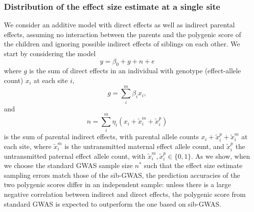 \documentclass[hidelinks, 12pt]{article}
\begin{document}
\subsubsection{Distribution of the effect size estimate at a single site}
We consider an additive model with direct effects as well as indirect parental effects, assuming no interaction between the parents and the polygenic score of the children and ignoring possible indirect effects of siblings on each other.
We start by considering the model
$$y=\beta_0+g+n+e$$
where $g$ is the sum of direct effects in an individual with genotype (effect-allele count) $x_i$ at each site $i$,
$$g=\sum_i^m\beta_ix_i,$$ 
and 
$$n=\sum_i^m\eta_i(x_i+\tilde{x}_i^m+\tilde{x}_i^p)$$ 
is the sum of parental indirect effects, with parental allele counts $x_i+\tilde{x}_i^p+\tilde{x}_i^m$ at each site, where $\tilde{x}_i^m$ is the untransmitted maternal effect allele count, and $\tilde{x}_i^p$ the untransmitted paternal effect allele count, with $\tilde{x}_i^m,\tilde{x}_i^p \in \{0,1\}$.  As we show, when we choose the standard GWAS sample size $n^*$ such that the effect size estimate sampling errors match those of the sib-GWAS, the prediction accuracies of the two polygenic scores differ in an independent sample: unless there is a large negative correlation between indirect and direct effects, the polygenic score from standard GWAS is expected to outperform the one based on sib-GWAS.  
\end{document}
